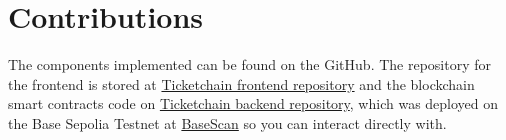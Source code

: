 \section{Contributions}
\label{sec:contributions}

The components implemented can be found on the GitHub. The repository for the
frontend is stored at \href{https://github.com/Krfld/Ticketchain}{Ticketchain
    frontend repository} and the blockchain smart contracts code on
\href{https://github.com/Krfld/Ticketchain-Foundry}{Ticketchain backend
    repository}, which was deployed on the Base Sepolia Testnet at
\href{https://sepolia.basescan.org/address/0x87f4a5c17c2d3dc48f8e19d81e319230fa28f20d}{BaseScan}
so you can interact directly with.

